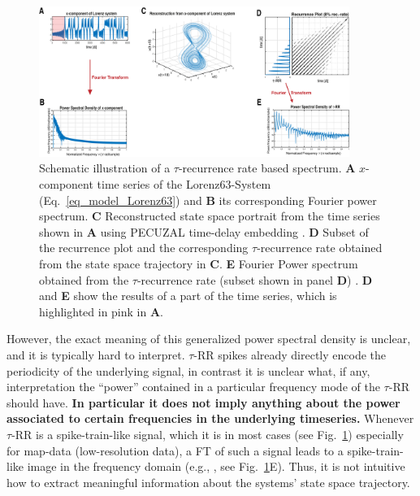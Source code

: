 \documentclass[entropy,article,submit,pdftex,moreauthors]{Definitions/mdpi}
\begin{document}
\begin{figure}
 \centering
 \includegraphics[width=0.9\textwidth]{./figures/fig_tau_rr_spectrum_example}
 \caption{Schematic illustration of a $\tau$-recurrence rate based spectrum. \textbf{A} $x$-component time series of the Lorenz63-System (Eq.~\eqref{eq_model_Lorenz63}) and 
 \textbf{B} its corresponding Fourier power spectrum. 
 \textbf{C} Reconstructed state space portrait from the time series shown in \textbf{A} using PECUZAL time-delay embedding \cite{Kraemer2021}. 
 \textbf{D} Subset of the recurrence plot and the corresponding $\tau$-recurrence rate obtained from the state space trajectory in \textbf{C}. 
 \textbf{E} Fourier Power spectrum obtained from the $\tau$-recurrence rate (subset shown in panel \textbf{D}) \cite{Zbilut2008}. \textbf{D} and \textbf{E} show the results of a part of the time series, 
 which is highlighted in pink in \textbf{A}.
 }\label{fig_tau_rr_spectrum_example}
\end{figure}

However, the exact meaning of this generalized power spectral density is unclear, and it is typically hard to interpret. $\tau$-RR spikes already directly encode the periodicity of the underlying signal, in contrast it is unclear what, if any, interpretation the ``power'' contained in a particular frequency mode of the $\tau$-RR should have. \textbf{In particular it does not imply anything about the power associated to certain frequencies in the underlying timeseries.} Whenever $\tau$-RR is a spike-train-like signal, which it is in most cases (see Fig.~\ref{fig_tau_rr_spectrum_example}) especially for 
map-data (low-resolution data), a FT of such a signal leads to a spike-train-like image in the frequency domain (e.g., \cite{Schild1982,Cordoba1989}, see 
Fig.~\ref{fig_tau_rr_spectrum_example}E). Thus, it is not intuitive how to extract meaningful information about the systems' state space trajectory. 
\end{document}
